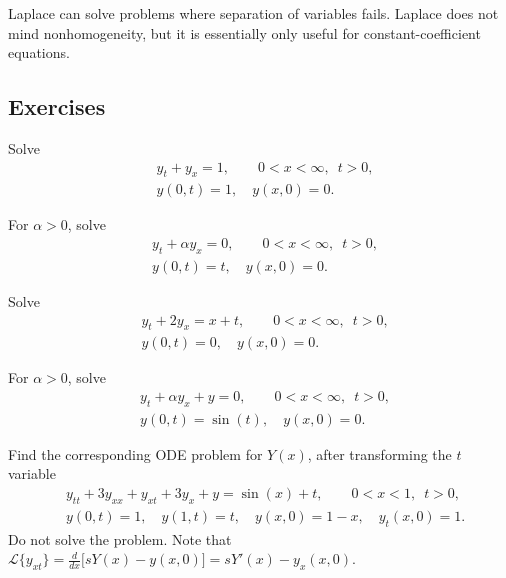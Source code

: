 Laplace can solve problems where separation of variables fails.
Laplace does not mind nonhomogeneity, but it is essentially only useful for
constant-coefficient equations.

\subsection{Exercises}

\begin{exercise}
Solve
\begin{align*}
& y_t + y_x = 1, \qquad 0 < x < \infty, \enspace t > 0,
\\
& y(0,t) = 1, \quad y(x,0) = 0 .
\end{align*}
\end{exercise}

\begin{exercise}
For $\alpha > 0$, solve
\begin{align*}
& y_t + \alpha y_x = 0, \qquad 0 < x < \infty, \enspace t > 0,
\\
& y(0,t) = t, \quad y(x,0) = 0 .
\end{align*}
\end{exercise}

\begin{exercise}
Solve
\begin{align*}
& y_t + 2 y_x = x+t, \qquad 0 < x < \infty, \enspace t > 0,
\\
& y(0,t) = 0, \quad y(x,0) = 0 .
\end{align*}
\end{exercise}

\begin{exercise}
For $\alpha > 0$, solve
\begin{align*}
& y_t + \alpha y_x + y = 0, \qquad 0 < x < \infty, \enspace t > 0,
\\
& y(0,t) = \sin(t), \quad y(x,0) = 0 .
\end{align*}
\end{exercise}

\begin{exercise}
Find the corresponding ODE problem for $Y(x)$, after transforming the $t$
variable
\begin{align*}
& y_{tt} + 3y_{xx} + y_{xt} + 3 y_x + y = \sin(x) + t, \qquad 0 < x < 1, \enspace t > 0,
\\
& y(0,t) = 1, \quad y(1,t) =  t, \quad y(x,0) = 1-x, \quad y_t(x,0) = 1 .
\end{align*}
Do not solve the problem.
Note that $\mathcal{L} \{ y_{xt} \}
= \frac{d}{dx} \bigl[ sY(x) - y(x,0) \bigr] = sY'(x) - y_x(x,0)$.
\end{exercise}

